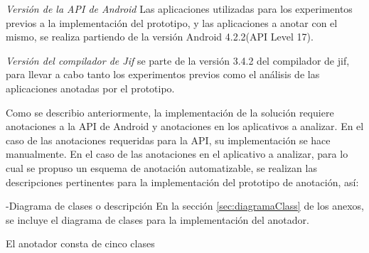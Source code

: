 \textit{Versión de la API de Android}\newline
Las aplicaciones utilizadas para los experimentos previos a la implementación
del prototipo, y las aplicaciones a anotar con el mismo, se realiza partiendo de
la versión Android 4.2.2(API Level 17).

\textit{Versión del compilador de Jif}\newline
se parte de la versión 3.4.2 del compilador de jif, para llevar a cabo tanto los
experimentos previos como el análisis de las aplicaciones anotadas por el prototipo.


Como se describio anteriormente, la implementación de la solución requiere
anotaciones a la API de Android y anotaciones en los aplicativos a analizar.
En el caso de las anotaciones requeridas para la API, su implementación se hace
manualmente. En el caso de las anotaciones en el aplicativo a analizar, para lo
cual se propuso un esquema de anotación automatizable, se realizan las
descripciones pertinentes para la implementación del prototipo de
anotación, así:\newline


-Diagrama de clases o descripción\newline
En la sección \ref{sec:diagramaClass} de los anexos, se incluye el diagrama de
clases para la implementación del anotador.\newline

El anotador consta de cinco clases 



